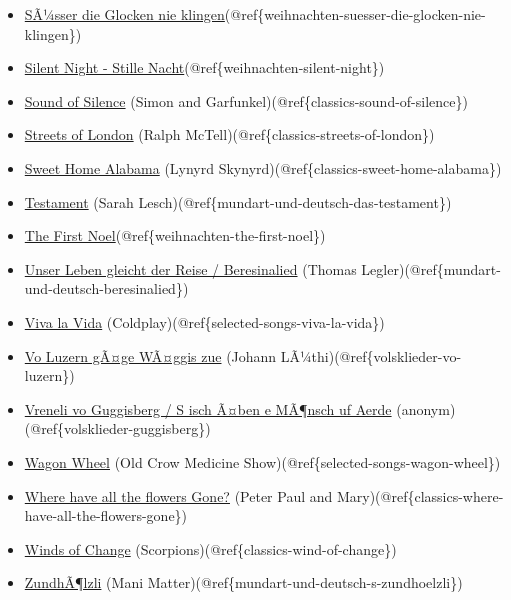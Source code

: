 \documentclass[
]{article}
\begin{document}
\begin{itemize}
\item
  \protect\hyperlink{weihnachten-suesser-die-glocken-nie-klingen}{SÃ¼sser
  die Glocken nie
  klingen}(@ref\{weihnachten-suesser-die-glocken-nie-klingen\})
\item
  \protect\hyperlink{weihnachten-silent-night}{Silent Night - Stille
  Nacht}(@ref\{weihnachten-silent-night\})
\item
  \protect\hyperlink{classics-sound-of-silence}{Sound of Silence} (Simon
  and Garfunkel)(@ref\{classics-sound-of-silence\})
\item
  \protect\hyperlink{classics-streets-of-london}{Streets of London}
  (Ralph McTell)(@ref\{classics-streets-of-london\})
\item
  \protect\hyperlink{classics-sweet-home-alabama}{Sweet Home Alabama}
  (Lynyrd Skynyrd)(@ref\{classics-sweet-home-alabama\})
\item
  \protect\hyperlink{mundart-und-deutsch-das-testament}{Testament}
  (Sarah Lesch)(@ref\{mundart-und-deutsch-das-testament\})
\item
  \protect\hyperlink{weihnachten-the-first-noel}{The First
  Noel}(@ref\{weihnachten-the-first-noel\})
\item
  \protect\hyperlink{mundart-und-deutsch-beresinalied}{Unser Leben
  gleicht der Reise / Beresinalied} (Thomas
  Legler)(@ref\{mundart-und-deutsch-beresinalied\})
\item
  \protect\hyperlink{selected-songs-viva-la-vida}{Viva la Vida}
  (Coldplay)(@ref\{selected-songs-viva-la-vida\})
\item
  \protect\hyperlink{volsklieder-vo-luzern}{Vo Luzern gÃ¤ge WÃ¤ggis zue}
  (Johann LÃ¼thi)(@ref\{volsklieder-vo-luzern\})
\item
  \protect\hyperlink{volsklieder-guggisberg}{Vreneli vo Guggisberg / S
  isch Ã¤ben e MÃ¶nsch uf Aerde}
  (anonym)(@ref\{volsklieder-guggisberg\})
\item
  \protect\hyperlink{selected-songs-wagon-wheel}{Wagon Wheel} (Old Crow
  Medicine Show)(@ref\{selected-songs-wagon-wheel\})
\item
  \protect\hyperlink{classics-where-have-all-the-flowers-gone}{Where
  have all the flowers Gone?} (Peter Paul and
  Mary)(@ref\{classics-where-have-all-the-flowers-gone\})
\item
  \protect\hyperlink{classics-wind-of-change}{Winds of Change}
  (Scorpions)(@ref\{classics-wind-of-change\})
\item
  \protect\hyperlink{mundart-und-deutsch-s-zundhoelzli}{ZundhÃ¶lzli}
  (Mani Matter)(@ref\{mundart-und-deutsch-s-zundhoelzli\})
\end{itemize}
\end{document}
